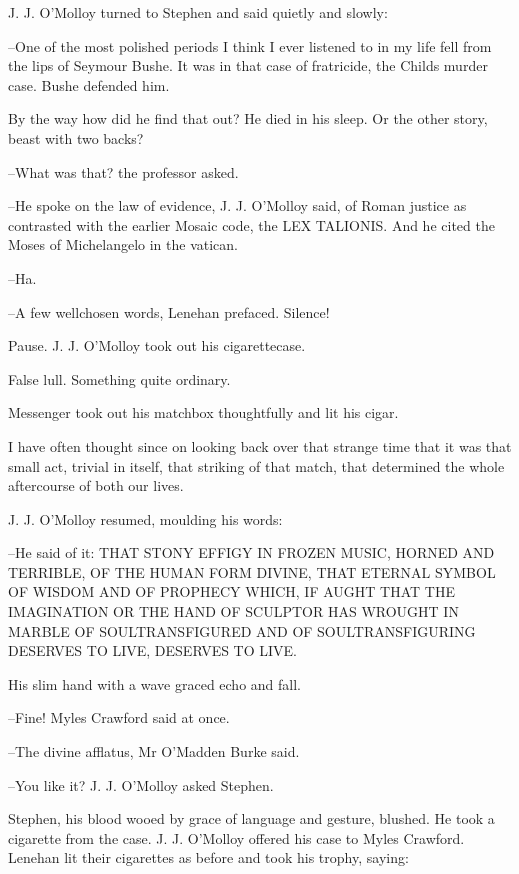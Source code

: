 J. J. O'Molloy turned to Stephen and said quietly and slowly:

--One of the most polished periods I think I ever listened to in my life
fell from the lips of Seymour Bushe. It was in that case of fratricide,
the Childs murder case. Bushe defended him.


By the way how did he find that out? He died in his sleep. Or the
other story, beast with two backs?

--What was that? the professor asked.



--He spoke on the law of evidence, J. J. O'Molloy said, of Roman justice
as contrasted with the earlier Mosaic code, the LEX TALIONIS. And he cited
the Moses of Michelangelo in the vatican.

--Ha.

--A few wellchosen words, Lenehan prefaced. Silence!

Pause. J. J. O'Molloy took out his cigarettecase.

False lull. Something quite ordinary.

Messenger took out his matchbox thoughtfully and lit his cigar.

I have often thought since on looking back over that strange time that
it was that small act, trivial in itself, that striking of that match,
that determined the whole aftercourse of both our lives.



J. J. O'Molloy resumed, moulding his words:

--He said of it: THAT STONY EFFIGY IN FROZEN MUSIC, HORNED AND TERRIBLE,
OF THE HUMAN FORM DIVINE, THAT ETERNAL SYMBOL OF WISDOM AND OF PROPHECY
WHICH, IF AUGHT THAT THE IMAGINATION OR THE HAND OF SCULPTOR HAS WROUGHT
IN MARBLE OF SOULTRANSFIGURED AND OF SOULTRANSFIGURING DESERVES TO LIVE,
DESERVES TO LIVE.

His slim hand with a wave graced echo and fall.

--Fine! Myles Crawford said at once.

--The divine afflatus, Mr O'Madden Burke said.

--You like it? J. J. O'Molloy asked Stephen.

Stephen, his blood wooed by grace of language and gesture, blushed.
He took a cigarette from the case. J. J. O'Molloy offered his case to
Myles Crawford. Lenehan lit their cigarettes as before and took his
trophy, saying:

